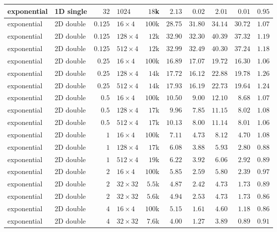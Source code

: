 {\begin{longtable}{llrlrrrrrr}
    exponential & 1D single & $32$ & $1024$ & $18$k & $2.13$ & $0.02$ & $2.01$ & $0.01$ & $0.95$ \\
    \midrule
    exponential & 2D double & $0.125$ & $16{\times}4$ & $100$k & $28.75$ & $31.80$ & $34.14$ & $30.72$ & $1.07$ \\
    exponential & 2D double & $0.125$ & $128{\times}4$ & $12$k & $32.90$ & $32.30$ & $40.39$ & $37.32$ & $1.19$ \\
    exponential & 2D double & $0.125$ & $512{\times}4$ & $12$k & $32.99$ & $32.49$ & $40.30$ & $37.24$ & $1.18$ \\
    exponential & 2D double & $0.25$ & $16{\times}4$ & $100$k & $16.89$ & $17.07$ & $19.72$ & $16.30$ & $1.06$ \\
    exponential & 2D double & $0.25$ & $128{\times}4$ & $14$k & $17.72$ & $16.12$ & $22.88$ & $19.78$ & $1.26$ \\
    exponential & 2D double & $0.25$ & $512{\times}4$ & $14$k & $17.93$ & $16.19$ & $22.73$ & $19.64$ & $1.24$ \\
    exponential & 2D double & $0.5$ & $16{\times}4$ & $100$k & $10.50$ & $9.00$ & $12.10$ & $8.68$ & $1.07$ \\
    exponential & 2D double & $0.5$ & $128{\times}4$ & $17$k & $9.96$ & $7.85$ & $11.15$ & $8.02$ & $1.08$ \\
    exponential & 2D double & $0.5$ & $512{\times}4$ & $17$k & $10.13$ & $8.00$ & $11.14$ & $8.01$ & $1.06$ \\
    exponential & 2D double & $1$ & $16{\times}4$ & $100$k & $7.11$ & $4.73$ & $8.12$ & $4.70$ & $1.08$ \\
    exponential & 2D double & $1$ & $128{\times}4$ & $17$k & $6.08$ & $3.88$ & $5.93$ & $2.80$ & $0.88$ \\
    exponential & 2D double & $1$ & $512{\times}4$ & $19$k & $6.22$ & $3.92$ & $6.06$ & $2.92$ & $0.89$ \\
    exponential & 2D double & $2$ & $16{\times}4$ & $100$k & $5.85$ & $2.59$ & $5.80$ & $2.39$ & $0.97$ \\
    exponential & 2D double & $2$ & $32{\times}32$ & $5.5$k & $4.87$ & $2.42$ & $4.73$ & $1.73$ & $0.89$ \\
    exponential & 2D double & $2$ & $32{\times}32$ & $5.6$k & $4.94$ & $2.53$ & $4.73$ & $1.73$ & $0.86$ \\
    exponential & 2D double & $4$ & $16{\times}4$ & $100$k & $5.15$ & $1.61$ & $4.60$ & $1.18$ & $0.86$ \\
    exponential & 2D double & $4$ & $32{\times}32$ & $7.6$k & $4.00$ & $1.27$ & $3.89$ & $0.89$ & $0.91$ \\

\end{longtable}}
